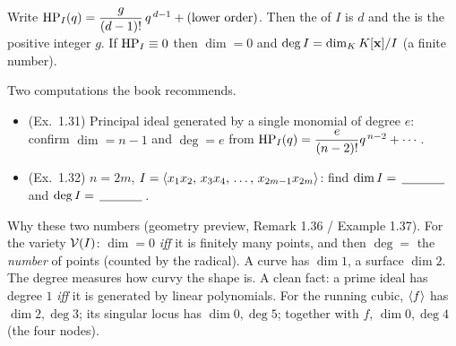 
\begin{definition}\label{def:dimdeg}
Write $\HP_I(q)=\dfrac{g}{(d-1)!}\,q^{\,d-1}+(\text{lower order})$. Then the  of
$I$ is $d$ and the  is the positive integer $g$. If $\HP_I\equiv0$ then $\dim=0$ and
$\deg I=\dim_K K[\xb]/I$ (a finite number).
\end{definition}


\begin{yourturn}
Two computations the book recommends.
\begin{itemize}[leftmargin=1.3em,itemsep=1pt]
  \item (Ex.\ 1.31) Principal ideal generated by a single monomial of degree $e$:
        confirm $\dim=n-1$ and $\deg=e$ from $\HP_I(q)=\dfrac{e}{(n-2)!}q^{\,n-2}+\cdots$.
  \item (Ex.\ 1.32) $n=2m$, $I=\gen{x_1x_2,\,x_3x_4,\,\dots,\,x_{2m-1}x_{2m}}$:
        find $\dim I=\fillin[1.2cm]$ and $\deg I=\fillin[1.2cm]$. 
\end{itemize}
\workspace[2]
\end{yourturn}

\begin{strand}
Why these two numbers (geometry preview, Remark 1.36 / Example 1.37). For the variety $\V(I)$:
$\dim=0$ \emph{iff} it is finitely many points, and then $\deg=$ the \emph{number} of points (counted
by the radical). A curve has $\dim 1$, a surface $\dim 2$. The degree measures how curvy the shape is.
A clean fact: a prime ideal has degree $1$ \emph{iff} it is generated by linear polynomials. For the
running cubic, $\gen f$ has $\dim 2,\deg 3$; its singular locus has $\dim 0,\deg 5$; together with $f$,
$\dim 0,\deg 4$ (the four nodes).
\end{strand}

